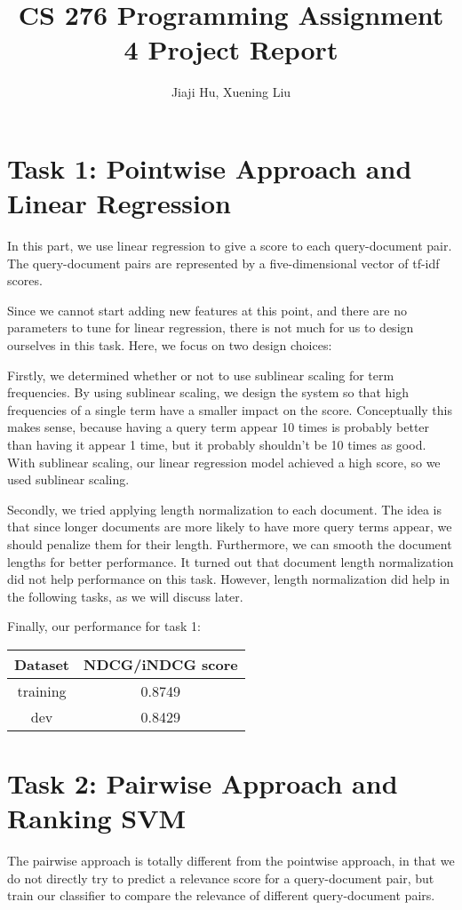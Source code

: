 \documentclass[10pt,twocolumn]{article}
\begin{document}
\title{CS 276 Programming Assignment 4 Project Report}
\author{Jiaji Hu, Xuening Liu}
\date{}
\maketitle

\section*{Task 1: Pointwise Approach and \\Linear Regression}
In this part, we use linear regression to give a score to each query-document pair. The query-document pairs are represented by a five-dimensional vector of tf-idf scores.

Since we cannot start adding new features at this point, and there are no parameters to tune for linear regression, there is not much for us to design ourselves in this task. Here, we focus on two design choices:

Firstly, we determined whether or not to use sublinear scaling for term frequencies. By using sublinear scaling, we design the system so that high frequencies of a single term have a smaller impact on the score. Conceptually this makes sense, because having a query term appear 10 times is probably better than having it appear 1 time, but it probably shouldn't be 10 times as good. With sublinear scaling, our linear regression model achieved a high score, so we used sublinear scaling.

Secondly, we tried applying length normalization to each document. The idea is that since longer documents are more likely to have more query terms appear, we should penalize them for their length. Furthermore, we can smooth the document lengths for better performance. It turned out that document length normalization did not help performance on this task. However, length normalization did help in the following tasks, as we will discuss later.

Finally, our performance for task 1:
\begin{table}[H]
\centering
\begin{tabular}{|c|c|}
\hline
Dataset & NDCG/iNDCG score \\\hline
training & 0.8749\\\hline
dev & 0.8429\\\hline
\end{tabular}
\end{table}

\section*{Task 2: Pairwise Approach and \\Ranking SVM}
The pairwise approach is totally different from the pointwise approach, in that we do not directly try to predict a relevance score for a query-document pair, but train our classifier to compare the relevance of different query-document pairs.
\end{document}
